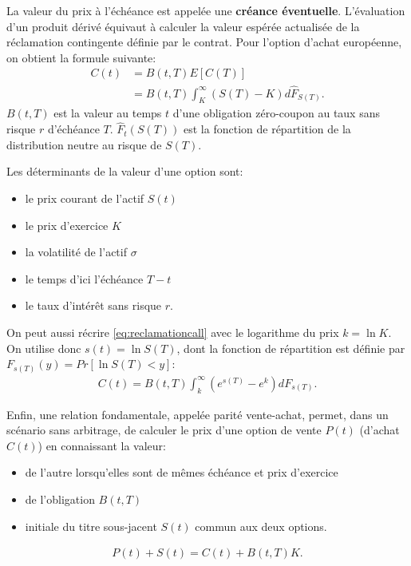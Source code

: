 La valeur du prix à l'échéance est appelée une \textbf{créance
  éventuelle}. L'évaluation d'un produit dérivé équivaut à calculer la
valeur espérée actualisée de la réclamation contingente définie par le
contrat. Pour l'option d'achat européenne, on obtient la formule
suivante:
\begin{align}
  C(t) &= B(t,T) E \left[C(T) \right] \nonumber\\
  &= B(t,T) \int_{K}^{\infty} (S(T)-K)
  d\hat{F}_{S(T)} \label{eq:reclamationcall}.
\end{align}
$B(t,T)$ est la valeur au temps $t$ d'une obligation zéro-coupon au taux sans
risque $r$ d'échéance $T$. $\hat{F}_t(S(T))$ est la fonction de
répartition de la distribution neutre au risque de $S(T)$.

Les déterminants de la valeur d'une option sont:
\begin{itemize}
\item le prix courant de l'actif $S(t)$
\item le prix d'exercice $K$
\item la volatilité de l'actif $\sigma$
\item le temps d'ici l'échéance $T-t$
\item le taux d'intérêt sans risque $r$.
\end{itemize}

On peut aussi récrire \eqref{eq:reclamationcall} avec le logarithme du
prix $k=\ln{K}$. On utilise donc $s(t)=\ln{S(T)}$, dont la fonction de
répartition est définie par ${F}_{s(T)}(y) = Pr\left[\ln{S(T)} < y
\right]$:
\begin{align}
  C(t) = B(t,T) \int_{k}^{\infty} (e^{s(T)}-e^{k}) d{F}_{s(T)}. \label{eq:reclamationcallintlog}
\end{align}

Enfin, une relation fondamentale, appelée parité vente-achat, permet,
dans un scénario sans arbitrage, de calculer le prix d'une option de
vente $P(t)$ (d'achat $C(t)$) en connaissant la valeur:
\begin{itemize}
\item de l'autre lorsqu'elles sont de mêmes échéance et prix
  d'exercice
\item de l'obligation $B(t,T)$
\item initiale du titre sous-jacent $S(t)$ commun aux deux options.
\end{itemize}

\begin{align}
  \label{eq:pariteputcall}
  P(t)+S(t) = C(t)+ B(t,T) K.
\end{align}

